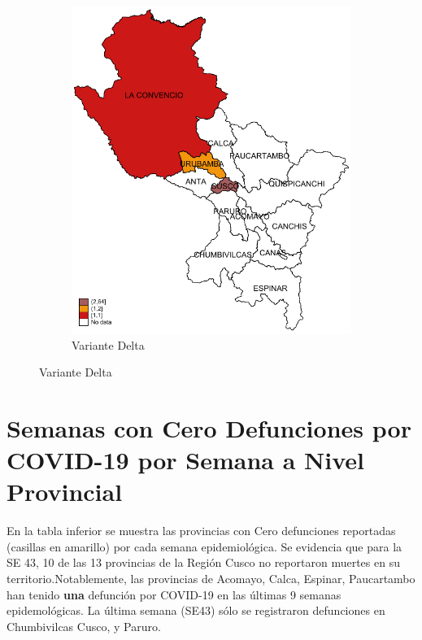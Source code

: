 \documentclass[12pt,a4paper,openany]{book}
\begin{document}
\begin{figure}[h]
				\vspace{10mm}
				\begin{subfigure}[b]{0.40\textwidth}
					\centering
					\includegraphics[width=\textwidth]{../figuras/variantes_provincial_delta.pdf}
					\caption{Variante Delta}
				\end{subfigure}
			\end{figure}

\clearpage


\clearpage
	\section*{Semanas con Cero Defunciones por COVID-19 por Semana a Nivel Provincial}
	
	\noindent En la tabla inferior se muestra las provincias con Cero defunciones reportadas (casillas en amarillo) por cada semana epidemiológica. Se evidencia que para la SE 43, 10 de las 13 provincias de la Región Cusco no reportaron muertes en su territorio.Notablemente, las provincias de Acomayo, Calca, Espinar, Paucartambo han tenido \textbf{\color{mycolor2}una} defunción por COVID-19 en las últimas 9 semanas epidemológicas. La última semana (SE43) sólo se registraron defunciones en Chumbivilcas Cusco, y Paruro.
	
\end{document}
